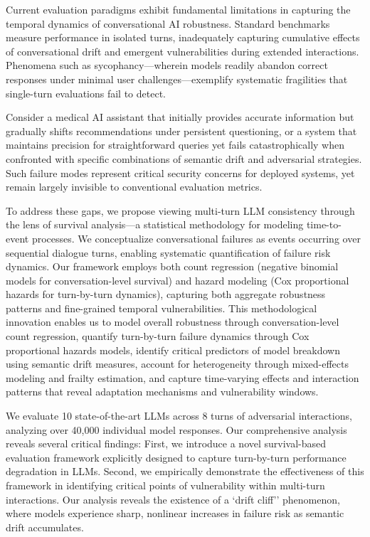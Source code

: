 \documentclass[letterpaper]{article}
\begin{document}
Current evaluation paradigms exhibit fundamental limitations in capturing the temporal dynamics of conversational AI robustness. Standard benchmarks measure performance in isolated turns, inadequately capturing cumulative effects of conversational drift and emergent vulnerabilities during extended interactions. Phenomena such as sycophancy—wherein models readily abandon correct responses under minimal user challenges—exemplify systematic fragilities that single-turn evaluations fail to detect.

Consider a medical AI assistant that initially provides accurate information but gradually shifts recommendations under persistent questioning, or a system that maintains precision for straightforward queries yet fails catastrophically when confronted with specific combinations of semantic drift and adversarial strategies. Such failure modes represent critical security concerns for deployed systems, yet remain largely invisible to conventional evaluation metrics.

To address these gaps, we propose viewing multi-turn LLM consistency through the lens of survival analysis—a statistical methodology for modeling time-to-event processes. We conceptualize conversational failures as events occurring over sequential dialogue turns, enabling systematic quantification of failure risk dynamics. Our framework employs both count regression (negative binomial models for conversation-level survival) and hazard modeling (Cox proportional hazards for turn-by-turn dynamics), capturing both aggregate robustness patterns and fine-grained temporal vulnerabilities. This methodological innovation enables us to model overall robustness through conversation-level count regression, quantify turn-by-turn failure dynamics through Cox proportional hazards models, identify critical predictors of model breakdown using semantic drift measures, account for heterogeneity through mixed-effects modeling and frailty estimation, and capture time-varying effects and interaction patterns that reveal adaptation mechanisms and vulnerability windows.

We evaluate 10 state-of-the-art LLMs across 8 turns of adversarial interactions, analyzing over 40,000 individual model responses. Our comprehensive analysis reveals several critical findings: First, we introduce a novel survival-based evaluation framework explicitly designed to capture turn-by-turn performance degradation in LLMs. Second, we empirically demonstrate the effectiveness of this framework in identifying critical points of vulnerability within multi-turn interactions. Our analysis reveals the existence of a `drift cliff'' phenomenon, where models experience sharp, nonlinear increases in failure risk as semantic drift accumulates.
\end{document}

